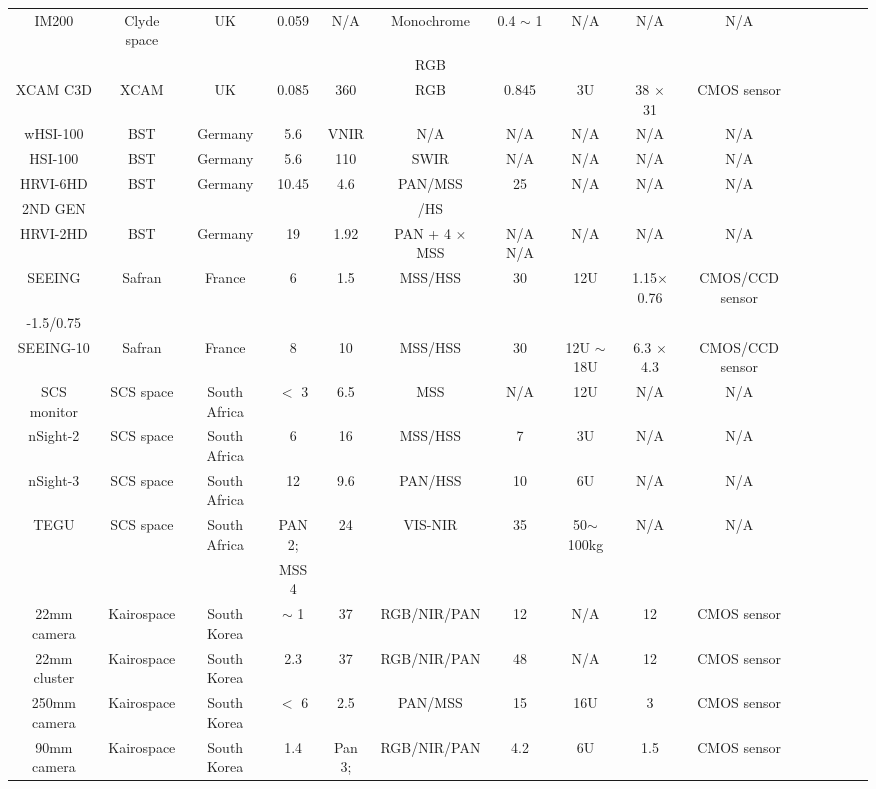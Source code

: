 \documentclass[final,5p,times,sort&compress,twocolumn]{elsarticle}
\begin{document}
\begin{table}
{\begin{tabular}{c c c c c c c c c c c c c c c}
			IM200 & Clyde space & UK & 0.059 & N/A & Monochrome & 0.4 $\sim$ 1 & N/A & N/A & N/A & \cite{clyde2023}\\
			& & & & &  RGB & & & & & & &  \\
			XCAM C3D & XCAM & UK & 0.085 & 360 & RGB & 0.845 & 3U & 38 $\times$ 31 & CMOS sensor & \cite{casini2020towards, xcam2023}\\
			wHSI-100 & BST & Germany & 5.6 &  VNIR & N/A &N/A & N/A & N/A &  N/A &\cite{bst2023}\\
			HSI-100 & BST & Germany & 5.6 & 110 &SWIR & N/A & N/A & N/A & N/A & \cite{bst2023}\\
			HRVI-6HD & BST & Germany & 10.45 & 4.6 &  PAN/MSS & 25 &  N/A & N/A & N/A & \cite{bst2023}\\
			2ND GEN& & & & &  /HS & & & & & & &  \\
			HRVI-2HD & BST & Germany & 19 & 1.92 &  PAN + 4 $\times$ MSS & N/A  N/A & N/A & N/A & N/A &\cite{bst2023}\\
			SEEING & Safran & France & 6 & 1.5 &  MSS/HSS & 30 & 12U & 1.15$\times$0.76 & CMOS/CCD  sensor & \cite{safran2023}\\
			-1.5/0.75 & & & & & & & & & & & & &  \\
			SEEING-10 & Safran & France & 8 & 10 & MSS/HSS & 30 &  12U $\sim$ 18U & 6.3 $\times$ 4.3 & CMOS/CCD sensor & \cite{safran2023}\\
			SCS monitor & SCS space & South Africa & $<$ 3 & 6.5 & MSS & N/A &  12U & N/A & N/A & \cite{scs2023}\\
			nSight-2 & SCS space & South Africa & 6 & 16 &  MSS/HSS & 7 & 3U & N/A & N/A & \cite{scs2023}\\
			nSight-3 & SCS space & South Africa & 12 & 9.6 &  PAN/HSS & 10 &  6U & N/A & N/A & \cite{scs2023}\\
			TEGU & SCS space & South Africa &  PAN 2; & 24 & VIS-NIR & 35 &  50$\sim$100kg & N/A & N/A & \cite{scs2023}\\
			& & & MSS 4 & &  & & & & & & &  \\
			22mm camera & Kairospace & South Korea & $\sim$ 1 & 37 & RGB/NIR/PAN & 12 &  N/A & 12 & CMOS sensor  & \cite{kairo2023} \\
			22mm cluster & Kairospace & South Korea & 2.3 & 37 &  RGB/NIR/PAN & 48 &  N/A & 12 & CMOS sensor  & \cite{kairo2023} \\
			250mm camera & Kairospace & South Korea & $<$ 6 & 2.5 & PAN/MSS & 15 &  16U & 3 & CMOS  sensor & \cite{kairo2023} \\
			90mm camera & Kairospace & South Korea & 1.4 & Pan 3; & RGB/NIR/PAN & 4.2 &  6U & 1.5 & CMOS sensor & \cite{kairo2023} \\

\end{tabular}}
\end{table}
\end{document}
